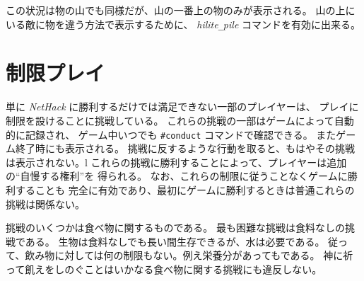 この状況は物の山でも同様だが、山の一番上の物のみが表示される。
山の上にいる敵に物を違う方法で表示するために、
{\it hilite\verb+_+pile\/} コマンドを有効に出来る。

\section{制限プレイ}

単に {\it NetHack\/} に勝利するだけでは満足できない一部のプレイヤーは、
プレイに制限を設けることに挑戦している。
これらの挑戦の一部はゲームによって自動的に記録され、
ゲーム中いつでも {\tt \#conduct} コマンドで確認できる。
またゲーム終了時にも表示される。
挑戦に反するような行動を取ると、もはやその挑戦は表示されない。l
これらの挑戦に勝利することによって、プレイヤーは追加の``自慢する権利''を
得られる。
なお、これらの制限に従うことなくゲームに勝利することも
完全に有効であり、最初にゲームに勝利するときは普通これらの挑戦は関係ない。

挑戦のいくつかは食べ物に関するものである。
最も困難な挑戦は食料なしの挑戦である。
生物は食料なしでも長い間生存できるが、水は必要である。
従って、飲み物に対しては何の制限もない。例え栄養分があってもである。
神に祈って飢えをしのぐことはいかなる食べ物に関する挑戦にも違反しない。

